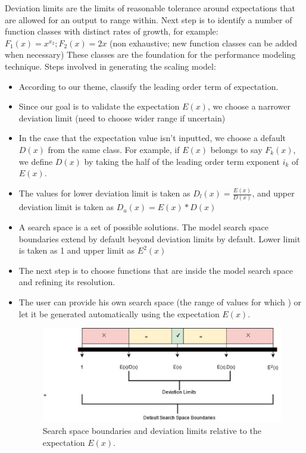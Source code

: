 \documentclass[journal, onecolumn]{IEEEtran}
\begin{document}
	Deviation limits are the limits of reasonable tolerance around expectations that are allowed for an output to range within. Next step is to identify a number of function classes with distinct rates of growth, for example: $F_1(x)={x^{x_2}}; F_2(x)={2x}$ (non exhaustive; new function classes can be added when necessary)
	\newline \newline
	These classes are the foundation for the performance modeling technique. Steps involved in generating the scaling model: 
	\begin{itemize}
		\item According to our theme, classify the leading order term of expectation.
		\item Since our goal is to validate the expectation $E(x)$, we choose a narrower deviation limit (need to choose wider range if uncertain) 
		\item In the case that the expectation value isn’t inputted, we choose a default $D(x)$ from the same class. For example, if $E(x)$ belongs to say $F_k(x)$, we define $D(x)$ by taking the half of the leading order term exponent $i_k$ of $E(x)$.
		\item The values for lower deviation limit is taken as $D_l(x)=\frac{E(x)}{D(x)}$, and upper deviation limit is taken as $D_u(x)=E(x)*D(x)$
		\item A search space is a set of possible solutions. The model search space boundaries extend by default beyond deviation limits by default. Lower limit is taken as 1 and upper limit as $E^2(x)$
		\item The next step is to choose functions that are inside the model search space and refining its resolution. 
		\item The user can provide his own search space (the range of values for which ) or let it be generated automatically using the expectation $E(x)$.
		\begin{figure}[H]
			\includegraphics[scale=0.5]{bar.eps}
			\centering
			\caption{Search space boundaries and deviation limits relative to the expectation $E(x)$.}

\end{figure}
\end{itemize}
\end{document}
